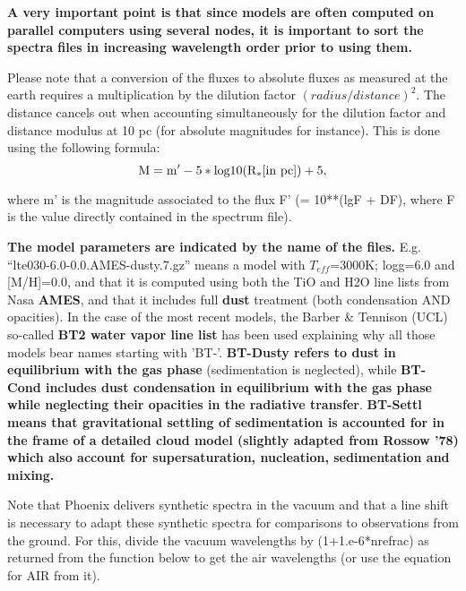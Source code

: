 \documentclass[12pt, a4paper]{article}
\begin{document}
\textbf{A very important point is that since models are often computed on parallel
computers using several nodes, it is important to sort the spectra files in
increasing wavelength order prior to using them.}

Please note that a conversion of the fluxes to absolute fluxes as measured at
the earth requires a multiplication by the dilution factor
$(radius/distance)^2$. The distance cancels out when accounting 
simultaneously for the dilution factor and distance modulus at 10 pc
(for absolute magnitudes for instance). This is done using the following
formula:
\[\rm M = m' - 5 * log10 ( R_{*} [in\ pc] ) + 5, \]

where m' is the magnitude associated to the flux F' (= 10**(lgF + DF), 
where F is the value directly contained in the spectrum file). 

\textbf{The model parameters are indicated by the name of the files.}
E.g. ``lte030-6.0-0.0.AMES-dusty.7.gz'' means a model with \(T_{eff}\)=3000K; 
logg=6.0 and [M/H]=0.0, and that it is computed using both the 
TiO and H2O line lists from Nasa \textbf{AMES}, and that it includes full 
\textbf{dust }treatment (both condensation AND opacities). In the case of the most
recent models, the Barber \& Tennison (UCL) so-called \textbf{ BT2 water vapor line list}
has been used explaining why all those models bear names starting with 'BT-'. 
\textbf{BT-Dusty refers to dust in equilibrium with the gas phase }(sedimentation is
neglected), while \textbf{BT-Cond includes dust condensation in equilibrium with the
gas phase while neglecting their opacities in the radiative transfer}. \textbf{BT-Settl
means that gravitational settling of sedimentation is accounted for in the
frame of a detailed cloud model (slightly adapted from Rossow '78) which also
account for supersaturation, nucleation, sedimentation and mixing.}   

Note that Phoenix delivers synthetic spectra in the vacuum and that a line
shift is necessary to adapt these synthetic spectra for comparisons to
observations from the ground. For this, divide the vacuum wavelengths by
(1+1.e-6*nrefrac) as returned from the function below to get the air 
wavelengths (or use the equation for AIR from it). 
\end{document}

